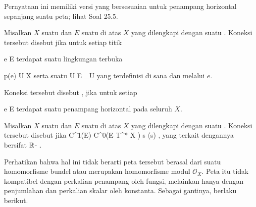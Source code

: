 Pernyataan ini memiliki versi yang bersesuaian untuk penampang horizontal sepanjang suatu peta; lihat
Soal 25.5.

{}
{

Misalkan $X$ suatu
dan $E$ suatu
di atas $X$ yang dilengkapi dengan suatu
.
Koneksi tersebut disebut
jika untuk setiap titik

\mavergleichskette
{\vergleichskette
{ e
}
{ \in }{ E
}
{  }{
}
{    }{
}
{   }{
}
}
{}{}{}
terdapat suatu lingkungan terbuka

\mavergleichskette
{\vergleichskette
{ p(e)
}
{ \in }{ U
}
{ \subseteq }{ X
}
{    }{
}
{   }{
}
}
{}{}{}
serta suatu
 { U } { E  \vert_U
} {}
yang terdefinisi di sana dan melalui $e$.

}
Koneksi tersebut disebut  {,} jika untuk setiap

\mavergleichskette
{\vergleichskette
{ e
}
{ \in }{ E
}
{  }{
}
{    }{
}
{   }{
}
}
{}{}{}
terdapat suatu penampang horizontal pada seluruh $X$.


{}
{

Misalkan $X$ suatu
dan $E$ suatu
di atas $X$ yang dilengkapi dengan suatu
.
Koneksi tersebut disebut
jika
\maabbeledisp {\nabla} {C^1(E)} { C^0(E \otimes T^* X )
} { s } { \nabla(s)
} {,}
yang terkait dengannya bersifat
${\mathbb R}$-
 {} {.}

}

Perhatikan bahwa hal ini tidak berarti peta tersebut berasal dari suatu homomorfisme bundel atau merupakan homomorfisme modul ${\mathcal O}_X$. Peta itu tidak kompatibel dengan perkalian penampang oleh fungsi, melainkan hanya dengan penjumlahan dan perkalian skalar oleh konstanta. Sebagai gantinya, berlaku  {} berikut.



